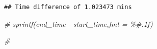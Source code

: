 \documentclass[
]{article}
\newenvironment{Shaded}{\begin{snugshade}}{\end{snugshade}}
\newcommand{\CommentTok}[1]{\textcolor[rgb]{0.56,0.35,0.01}{\textit{#1}}}
\begin{document}
\begin{verbatim}
## Time difference of 1.023473 mins
\end{verbatim}

\begin{Shaded}
\begin{Highlighting}[]
  \CommentTok{\# sprintf(end\_time {-} start\_time,fmt = \textquotesingle{}\%\#.1f\textquotesingle{})}
\end{Highlighting}
\end{Shaded}

\begin{Shaded}
\begin{Highlighting}[]
\CommentTok{\#}
\end{Highlighting}
\end{Shaded}
\end{document}
